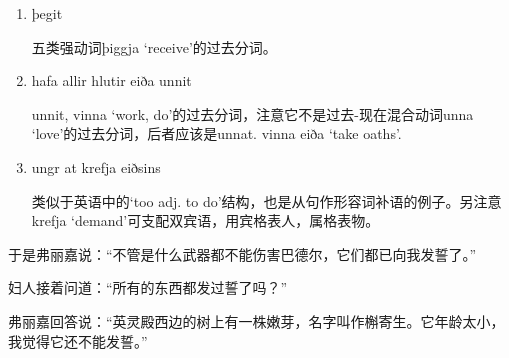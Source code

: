 \begin{grammar*}{}
  \begin{enumerate}[leftmargin=*]
    \item þegit

          五类强动词þiggja `receive'的过去分词。
    \item hafa allir hlutir eiða unnit

          unnit, vinna `work, do'的过去分词，注意它不是过去-现在混合动词unna `love'的过去分词，后者应该是unnat. vinna eiða `take oaths'.
    \item ungr at krefja eiðsins

          类似于英语中的`too adj. to do'结构，也是从句作形容词补语的例子。另注意krefja `demand'可支配双宾语，用宾格表人，属格表物。
  \end{enumerate}
\end{grammar*}
\begin{translation*}{}
  于是弗丽嘉说：“不管是什么武器都不能伤害巴德尔，它们都已向我发誓了。”

  妇人接着问道：“所有的东西都发过誓了吗？”

  弗丽嘉回答说：“英灵殿西边的树上有一株嫩芽，名字叫作槲寄生。它年龄太小，我觉得它还不能发誓。”
\end{translation*}

